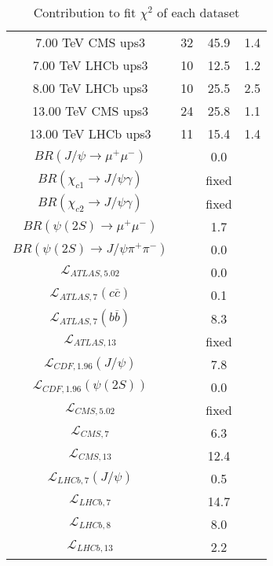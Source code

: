 \begin{table}[h!]
\begin{tabular}{c|c|c|c}
7.00 TeV CMS ups3 & 32 & 45.9 & 1.4 \\
7.00 TeV LHCb ups3 & 10 & 12.5 & 1.2 \\
8.00 TeV LHCb ups3 & 10 & 25.5 & 2.5 \\
13.00 TeV CMS ups3 & 24 & 25.8 & 1.1 \\
13.00 TeV LHCb ups3 & 11 & 15.4 & 1.4 \\
\hline
$BR(J/\psi\rightarrow\mu^+\mu^-)$ &  & 0.0 &  \\
$BR(\chi_{c1}\rightarrow J/\psi\gamma)$ &  & fixed & \\
$BR(\chi_{c2}\rightarrow J/\psi\gamma)$ &  & fixed & \\
$BR(\psi(2S)\rightarrow\mu^+\mu^-)$ &  & 1.7 &  \\
$BR(\psi(2S)\rightarrow J/\psi\pi^+\pi^-)$ &  & 0.0 &  \\
$\mathcal L_{ATLAS,5.02}$ &  & 0.0 &  \\
$\mathcal L_{ATLAS,7}(c\overline c)$ &  & 0.1 &  \\
$\mathcal L_{ATLAS,7}(b\overline b)$ &  & 8.3 &  \\
$\mathcal L_{ATLAS,13}$ &  & fixed & \\
$\mathcal L_{CDF,1.96}(J/\psi)$ &  & 7.8 &  \\
$\mathcal L_{CDF,1.96}(\psi(2S))$ &  & 0.0 &  \\
$\mathcal L_{CMS,5.02}$ &  & fixed & \\
$\mathcal L_{CMS,7}$ &  & 6.3 &  \\
$\mathcal L_{CMS,13}$ &  & 12.4 &  \\
$\mathcal L_{LHCb,7}(J/\psi)$ &  & 0.5 &  \\
$\mathcal L_{LHCb,7}$ &  & 14.7 &  \\
$\mathcal L_{LHCb,8}$ &  & 8.0 &  \\
$\mathcal L_{LHCb,13}$ &  & 2.2 &  \\
\end{tabular}
\caption{Contribution to fit $\chi^2$ of each dataset}
\end{table}
